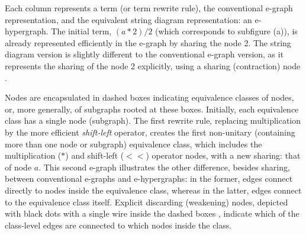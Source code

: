 Each column represents a term (or term rewrite rule), the conventional e-graph representation, and the equivalent string diagram representation: an e-hypergraph. 
The initial term, $(a*2)/2$ (which corresponds to subfigure (a)), is already represented efficiently in the e-graph by sharing the node 2.
The string diagram version is slightly different to the conventional e-graph version, as it represents the sharing of the node 2 explicitly, using a sharing (contraction) node
. 

Nodes are encapsulated in dashed boxes indicating equivalence classes of nodes, or, more generally, of subgraphs rooted at these boxes.
Initially, each equivalence class has a single node (subgraph).
The first rewrite rule, replacing multiplication by the more efficient \emph{shift-left} operator, creates the first non-unitary (containing more than one node or subgraph) equivalence class, which includes the multiplication ($*$) and shift-left ($<\!\!<$) operator nodes, with a new sharing: that of node $a$.
This second e-graph illustrates the other difference, besides sharing, between conventional e-graphs and e-hypergraphs: in the former, edges connect directly to nodes inside the equivalence class, whereas in the latter, edges connect to the equivalence class itself.
Explicit discarding (weakening) nodes, depicted with black dots with a single wire inside the dashed boxes 
, indicate which of the class-level edges are connected to which nodes inside the class.

